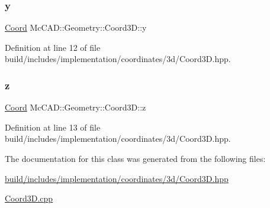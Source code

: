\mbox{\label{classMcCAD_1_1Geometry_1_1Coord3D_af6512434da6e0242b2606e2341abc01d}} 
\subsubsection{\texorpdfstring{y}{y}}
{\footnotesize\ttfamily \hyperlink{classMcCAD_1_1Geometry_1_1Coord}{Coord} Mc\+C\+A\+D\+::\+Geometry\+::\+Coord3\+D\+::y}



Definition at line 12 of file build/includes/implementation/coordinates/3d/\+Coord3\+D.\+hpp.

\mbox{\label{classMcCAD_1_1Geometry_1_1Coord3D_a5f89140bda6825a0a21d0064d05d9f4b}} 
\subsubsection{\texorpdfstring{z}{z}}
{\footnotesize\ttfamily \hyperlink{classMcCAD_1_1Geometry_1_1Coord}{Coord} Mc\+C\+A\+D\+::\+Geometry\+::\+Coord3\+D\+::z}



Definition at line 13 of file build/includes/implementation/coordinates/3d/\+Coord3\+D.\+hpp.



The documentation for this class was generated from the following files\+:\begin{DoxyCompactItemize}
\item 
\hyperlink{build_2includes_2implementation_2coordinates_23d_2Coord3D_8hpp}{build/includes/implementation/coordinates/3d/\+Coord3\+D.\+hpp}\item 
\hyperlink{Coord3D_8cpp}{Coord3\+D.\+cpp}\end{DoxyCompactItemize}
